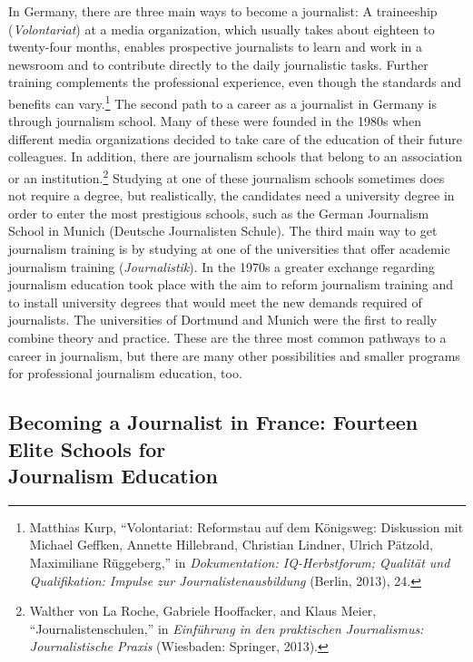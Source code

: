 \documentclass{tufte-handout}
\begin{document}
In Germany, there are three main ways to become a journalist: A
traineeship (\emph{Volontariat}) at a media organization, which usually
takes about eighteen to twenty-four months, enables prospective
journalists to learn and work in a newsroom and to contribute directly
to the daily journalistic tasks. Further training complements the
professional experience, even though the standards and benefits can
vary.\footnote{Matthias Kurp, ``Volontariat: Reformstau auf dem
  Königsweg: Diskussion mit Michael Geffken, Annette Hillebrand,
  Christian Lindner, Ulrich Pätzold, Maximiliane Rüggeberg,'' in
  \emph{Dokumentation: IQ-Herbstforum; Qualität und Qualifikation:
  Impulse zur Journalistenausbildung} (Berlin, 2013), 24.} The second
path to a career as a journalist in Germany is through journalism
school. Many of these were founded in the 1980s when different media
organizations decided to take care of the education of their future
colleagues. In addition, there are journalism schools that belong to an
association or an institution.\footnote{Walther von La Roche, Gabriele
  Hooffacker, and Klaus Meier, ``Journalistenschulen,'' in
  \emph{Einführung in den praktischen Journalismus: Journalistische
  Praxis} (Wiesbaden: Springer, 2013).} Studying at one of these
journalism schools sometimes does not require a degree, but
realistically, the candidates need a university degree in order to enter
the most prestigious schools, such as the German Journalism School in
Munich (Deutsche Journalisten Schule). The third main way to get
journalism training is by studying at one of the universities that offer
academic journalism training (\emph{Journalistik}). In the 1970s a
greater exchange regarding journalism education took place with the aim
to reform journalism training and to install university degrees that
would meet the new demands required of journalists. The universities of
Dortmund and Munich were the first to really combine theory and
practice. These are the three most common pathways to a career in
journalism, but there are many other possibilities and smaller programs
for professional journalism education, too.

\hypertarget{becoming-a-journalist-in-france-fourteen-elite-schools-for-journalism-education}{%
\subsection{Becoming a Journalist in France:
Fourteen Elite Schools for\\\noindent Journalism
Education}\label{becoming-a-journalist-in-france-fourteen-elite-schools-for-journalism-education}}
\end{document}
